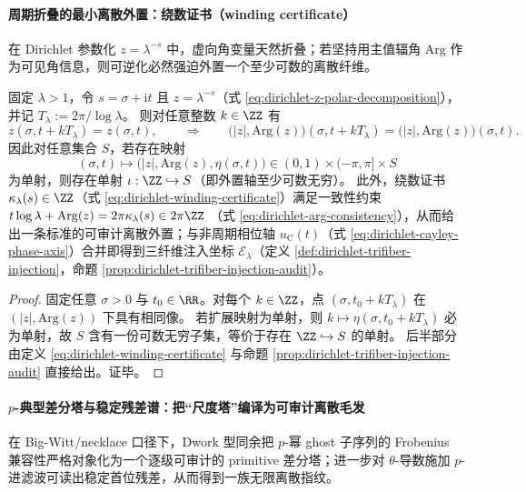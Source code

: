 \paragraph{周期折叠的最小离散外置：绕数证书（winding certificate）}
在 Dirichlet 参数化 \(z=\lambda^{-s}\) 中，虚向角变量天然折叠；若坚持用主值辐角 \(\mathrm{Arg}\) 作为可见角信息，则可逆化必然强迫外置一个至少可数的离散纤维。

\begin{theorem}\label{thm:dephys-dirichlet-winding-minimal}
固定 \(\lambda>1\)，令 \(s=\sigma+\mathrm{i}t\) 且 \(z=\lambda^{-s}\)（式 \eqref{eq:dirichlet-z-polar-decomposition}），并记 \(T_{\lambda}:=2\pi/\log\lambda\)。
则对任意整数 \(k\in\ZZ\) 有
\[
z(\sigma,t+kT_{\lambda})=z(\sigma,t),
\qquad\Longrightarrow\qquad
\bigl(|z|,\mathrm{Arg}(z)\bigr)(\sigma,t+kT_{\lambda})=\bigl(|z|,\mathrm{Arg}(z)\bigr)(\sigma,t).
\]
因此对任意集合 \(S\)，若存在映射
\[
(\sigma,t)\longmapsto \bigl(|z|,\mathrm{Arg}(z),\eta(\sigma,t)\bigr)\in (0,1)\times(-\pi,\pi]\times S
\]
为单射，则存在单射 \(\iota:\ZZ\hookrightarrow S\)（即外置轴至少可数无穷）。
此外，绕数证书 \(\kappa_{\lambda}(s)\in\ZZ\)（式 \eqref{eq:dirichlet-winding-certificate}）满足一致性约束
\(
t\log\lambda+\mathrm{Arg}(z)=2\pi\kappa_{\lambda}(s)\in 2\pi\ZZ
\)
（式 \eqref{eq:dirichlet-arg-consistency}），从而给出一条标准的可审计离散外置；与非周期相位轴 \(u_{\mathrm C}(t)\)（式 \eqref{eq:dirichlet-cayley-phase-axis}）合并即得到三纤维注入坐标 \(\mathcal{E}_{\lambda}\)（定义 \ref{def:dirichlet-trifiber-injection}，命题 \ref{prop:dirichlet-trifiber-injection-audit}）。
\end{theorem}

\begin{proof}
固定任意 \(\sigma>0\) 与 \(t_0\in\RR\)。对每个 \(k\in\ZZ\)，点 \((\sigma,t_0+kT_{\lambda})\) 在 \((|z|,\mathrm{Arg}(z))\) 下具有相同像。
若扩展映射为单射，则 \(k\mapsto \eta(\sigma,t_0+kT_{\lambda})\) 必为单射，故 \(S\) 含有一份可数无穷子集，等价于存在 \(\ZZ\hookrightarrow S\) 的单射。
后半部分由定义 \eqref{eq:dirichlet-winding-certificate} 与命题 \ref{prop:dirichlet-trifiber-injection-audit} 直接给出。证毕。
\end{proof}

\paragraph{\texorpdfstring{$p$}{p}-典型差分塔与稳定残差谱：把“尺度塔”编译为可审计离散毛发}
在 Big-Witt/necklace 口径下，Dwork 型同余把 \(p\)-幂 ghost 子序列的 Frobenius 兼容性严格对象化为一个逐级可审计的 primitive 差分塔；进一步对 \(\theta\)-导数施加 \(p\)-进滤波可读出稳定首位残差，从而得到一族无限离散指纹。

